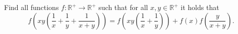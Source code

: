 Find all functions $f:\mathbb{R^{+}}\to\mathbb{R^+}$ such that for all $x,y\in\mathbb{R^+}$ it holds that$$f\left(xy\left(\frac{1}{x}+\frac{1}{y}+\frac{1}{x+y}\right)\right)=f\left(xy\left(\frac{1}{x}+\frac{1}{y}\right)\right)+f(x)f\left(\frac{y}{x+y}\right).$$